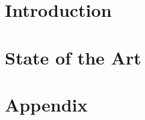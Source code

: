 \documentclass[twoside,openright,titlepage,numbers=noenddot,headinclude,
               footinclude=true,cleardoublepage=empty,abstractoff,
               BCOR=5mm,paper=a4,fontsize=11pt,ngerman,american,]{scrreprt}
\begin{document}
\frenchspacing
\raggedbottom
{}
\pagestyle{plain}



\pagestyle{scrheadings}



\cleardoublepage
\ctparttext{}
\part{Introduction}


% 

\cleardoublepage
\ctparttext{}
\part{State of the Art}








% 
% 
% 
% 
% 
% 
\appendix
\cleardoublepage
\part{Appendix}


% 
\end{document}

